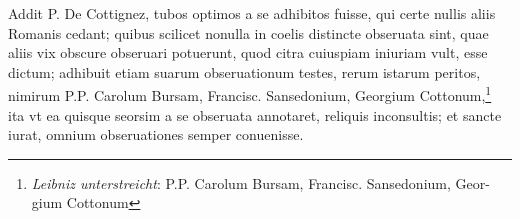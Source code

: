 \pend \pstart [p.~245] Addit P. De Cottignez\protect{}, tubos optimos a se adhibitos  fuisse, qui certe nullis aliis Romanis cedant; quibus scilicet nonulla in coelis distincte obseruata sint, quae aliis vix  obscure obseruari potuerunt, quod citra cuiuspiam iniuriam vult, esse dictum; adhibuit etiam suarum obseruationum testes, rerum istarum peritos, nimirum P.P. Carolum Bursam\protect{}, Francisc. Sansedonium\protect{}, Georgium Cottonum\protect{},\footnote{\textit{Leibniz unterstreicht}: P.P. Carolum Bursam, Francisc. Sansedonium, Geor-gium Cottonum} ita  vt ea quisque seorsim a se obseruata annotaret, reliquis  inconsultis; et sancte iurat, omnium obseruationes semper  conuenisse.\pend 